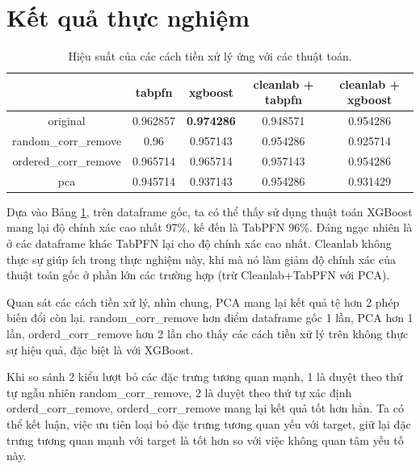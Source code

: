 \section {Kết quả thực nghiệm}
\begin{table}
    \centering
    \begin{tabular}{c|c|c|c|c}
         & tabpfn & xgboost & cleanlab + tabpfn & cleanlab + xgboost \\
        \hline
        original & 0.962857 & \textbf{0.974286} & 0.948571 & 0.954286 \\
        \hline
        random\_corr\_remove & 0.96 & 0.957143 & 0.954286 & 0.925714 \\
        \hline
        ordered\_corr\_remove & 0.965714 & 0.965714 & 0.957143 & 0.954286 \\
        \hline
        pca & 0.945714 & 0.937143 & 0.954286 & 0.931429
    \end{tabular}
    \caption{Hiệu suất của các cách tiền xử lý ứng với các thuật toán.}
    \label{tab:performance}
\end{table}
Dựa vào Bảng \ref{tab:performance}, trên dataframe gốc, ta có thể thấy sử dụng thuật toán XGBoost mang lại độ chính xác cao nhất 97\%, kế đến là TabPFN 96\%. Đáng ngạc nhiên là ở các dataframe khác TabPFN lại cho độ chính xác cao nhất. Cleanlab không thực sự giúp ích trong thực nghiệm này, khi mà nó làm giảm độ chính xác của thuật toán gốc ở phần lớn các trường hợp (trừ Cleanlab+TabPFN với PCA).

Quan sát các cách tiền xử lý, nhìn chung, PCA mang lại kết quả tệ hơn 2 phép biến đổi còn lại. random\_corr\_remove hơn điểm dataframe gốc 1 lần, PCA hơn 1 lần, orderd\_corr\_remove hơn 2 lần cho thấy các cách tiền xử lý trên không thực sự hiệu quả, đặc biệt là với XGBoost.

Khi so sánh 2 kiểu lượt bỏ các đặc trưng tương quan mạnh, 1 là duyệt theo thứ tự ngẫu nhiên random\_corr\_remove, 2 là duyệt theo thứ tự xác định orderd\_corr\_remove, orderd\_corr\_remove mang lại kết quả tốt hơn hẳn. Ta có thể kết luận, việc ưu tiên loại bỏ đặc trưng tương quan yếu với target, giữ lại đặc trưng tương quan mạnh với target là tốt hơn so với việc không quan tâm yếu tố này.




